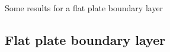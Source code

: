\documentclass[10pt]{article}
\begin{document}


\def\comma  {~~~,~~}
\newcommand{\uvd}{\mathbf{U}}
\def\ud     {{    U}}
\def\pd     {{    P}}
\def\calo{{\cal O}}

\newcommand{\mbar}{\bar{m}}
\newcommand{\Rbar}{\bar{R}}
\newcommand{\Ru}{R_u}         %
\newcommand{\Div}{\grad\cdot}
\newcommand{\tauv}{\boldsymbol{\tau}}
\newcommand{\thetav}{\boldsymbol{\theta}}

\newcommand{\Omegav}{\boldsymbol{\Omega}}
\newcommand{\omegav}{\boldsymbol{\omega}}
\newcommand{\sigmav}{\boldsymbol{\sigma}}
\newcommand{\cm}{{\rm cm}}

\newcommand{\ds}{\Delta s}
\newcommand{\dsbl}{\ds_{\rm bl}}


\newcommand{\sumi}{\sum_{i=1}^n}
\newcommand{\dt}{{\Delta t}}

\def\ff {\tt} %


\newcommand{\Bc}{{\mathcal B}}
\newcommand{\Dc}{{\mathcal D}}
\newcommand{\Ec}{{\mathcal E}}
\newcommand{\Fc}{{\mathcal F}}
\newcommand{\Gc}{{\mathcal G}}
\newcommand{\Hc}{{\mathcal H}}
\newcommand{\Ic}{{\mathcal I}}
\newcommand{\Jc}{{\mathcal J}}
\newcommand{\Lc}{{\mathcal L}}
\newcommand{\Nc}{{\mathcal N}}
\newcommand{\Pc}{{\mathcal P}}
\newcommand{\Rc}{{\mathcal R}}
\newcommand{\Sc}{{\mathcal S}}

\newcommand{\bogus}[1]{}  %

\vspace{5\baselineskip}
\begin{flushleft}
{\Large
Some results for a flat plate boundary layer
}

\end{flushleft}


\subsection{Flat plate boundary layer} \label{sec:flatPlateBoundaryLayer}
\end{document}
